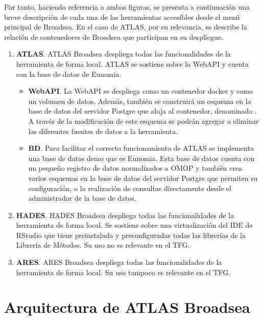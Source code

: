 Por tanto, haciendo referencia a ambas figuras, se presenta a continuación una breve descripción de cada una de las herramientas accesibles desde el menú principal de Broadsea. En el caso de ATLAS, por su relevancia, se describe la relación de contenedores de Broadsea que participan en su despliegue.

\begin{enumerate}

    \item \textbf{ATLAS}. ATLAS Broadsea despliega todas las funcionalidades de la herramienta de forma local. ATLAS se sostiene sobre la WebAPI y cuenta con la base de datos de Eunomia.
    
    \begin{itemize}
        \item \textbf{WebAPI}. La WebAPI se despliega como un contenedor docker y como un volumen de datos. Además, también se construirá un esquema en la base de datos del servidor Postgre que aloja al contenedor, denominado . A través de la modificación de este esquema se podrán agregar o eliminar las diferentes fuentes de datos a la herramienta.
        \item \textbf{BD}. Para facilitar el correcto funcionamiento de ATLAS se implementa una base de datos demo que es Eunomia. Esta base de datos cuenta con un pequeño registro de datos normalizados a OMOP y también crea varios esquemas en la base de datos del servidor Postgre que permiten su configuración, o la realización de consultas directamente desde el administrador de la base de datos.
    \end{itemize}

    \item \textbf{HADES}. HADES Broadsea despliega todas las funcionalidades de la herramienta de forma local. Se sostiene sobre una virtualización del IDE de RStudio que tiene preinstalada y preconfiguradas todas las librerías de la Librería de Métodos. Su uso no es relevante en el TFG.
   
    \item \textbf{ARES}. ARES Broadsea despliega todas las funcionalidades de la herramienta de forma local. Su uso tampoco es relevante en el TFG.

\end{enumerate}

\section{Arquitectura de ATLAS Broadsea} \label{sec:08atlas}

